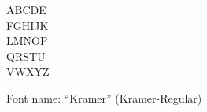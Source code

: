 \documentclass[a4paper]{article}
\begin{document}
\begin{center}
\fontsize{60pt}{72pt}
  ABCDE \\
  FGHIJK \\
  LMNOP \\
  QRSTU \\
  VWXYZ \\
\end{center}
\vfill
\begin{center}
Font name: ``Kramer'' (Kramer-Regular)
\end{center}
\end{document}
